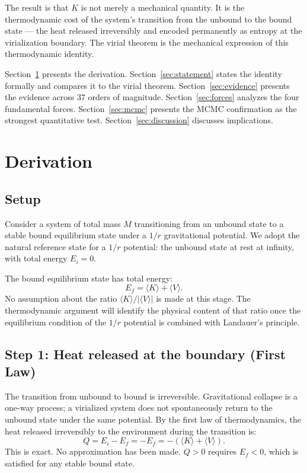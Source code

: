 \documentclass[12pt,a4paper]{article}
\begin{document}
The result is that $K$ is not merely a mechanical quantity. It is the
thermodynamic cost of the system's transition from the unbound to the
bound state --- the heat released irreversibly and encoded permanently as
entropy at the virialization boundary. The virial theorem is the mechanical
expression of this thermodynamic identity.

Section~\ref{sec:derivation} presents the derivation.
Section~\ref{sec:statement} states the identity formally and compares it
to the virial theorem.
Section~\ref{sec:evidence} presents the evidence across 37 orders of
magnitude.
Section~\ref{sec:forces} analyzes the four fundamental forces.
Section~\ref{sec:mcmc} presents the MCMC confirmation as the strongest
quantitative test.
Section~\ref{sec:discussion} discusses implications.

\section{Derivation}
\label{sec:derivation}

\subsection{Setup}

Consider a system of total mass $M$ transitioning from an unbound state to
a stable bound equilibrium state under a $1/r$ gravitational potential. We
adopt the natural reference state for a $1/r$ potential: the unbound state
at rest at infinity, with total energy $E_i = 0$.

The bound equilibrium state has total energy:
\begin{equation}
E_f = \langle K \rangle + \langle V \rangle.
\label{eq:Ef}
\end{equation}
No assumption about the ratio $\langle K \rangle / |\langle V \rangle|$ is
made at this stage. The thermodynamic argument will identify the physical
content of that ratio once the equilibrium condition of the $1/r$ potential
is combined with Landauer's principle.

\subsection{Step 1: Heat released at the boundary (First Law)}

The transition from unbound to bound is irreversible. Gravitational
collapse is a one-way process; a virialized system does not spontaneously
return to the unbound state under the same potential. By the first law of
thermodynamics, the heat released irreversibly to the environment during
the transition is:
\begin{equation}
Q = E_i - E_f = -E_f = -(\langle K \rangle + \langle V \rangle).
\label{eq:Q_firstlaw}
\end{equation}
This is exact. No approximation has been made. $Q > 0$ requires
$E_f < 0$, which is satisfied for any stable bound state.
\end{document}
